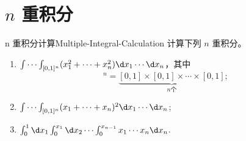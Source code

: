 \section{\texorpdfstring{$n$}{n} 重积分}

\begin{problem}{n 重积分计算}{Multiple-Integral-Calculation}
    计算下列 $n$ 重积分。
    \begin{enumerate}
        \item $\int \cdots \int_{[0,1]^n} (x_1^2 + \cdots + x_n^2) \d x_1 \cdots \d x_n$，其中
              \begin{equation}
                  [0, 1]^n = \underbrace{[0, 1] \times [0, 1] \times \cdots \times [0, 1]}_{n \text{个}};
              \end{equation}
        \item $\int \cdots \int_{[0,1]^n} (x_1 + \cdots + x_n)^2 \d x_1 \cdots \d x_n$;
        \item $\int_0^1 \d x_1 \int_0^{x_1} \d x_2 \cdots \int_0^{x_{n-1}} x_1 \cdots x_n \d x_n$.
    \end{enumerate}
\end{problem}

